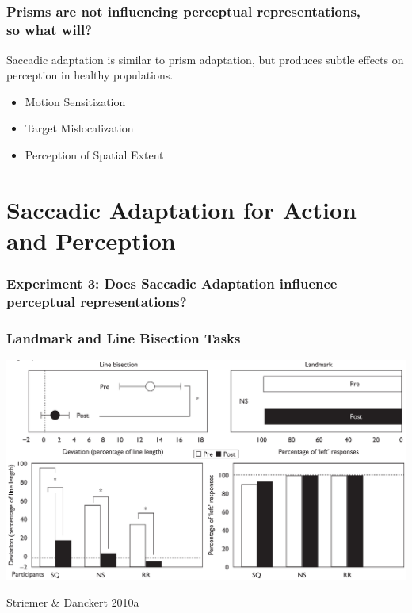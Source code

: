 \documentclass{beamer}
\begin{document}
\subsection*{}
\begin{frame}
	\frametitle{Prisms are not influencing perceptual representations, \\ so what will?}
	Saccadic adaptation is similar to prism adaptation, but produces subtle effects on perception in healthy populations.
	\begin{itemize}
		\item Motion Sensitization
		\item Target Mislocalization
		\item Perception of Spatial Extent
	\end{itemize}
\end{frame}


\section[Saccadic Adaptation]{Saccadic Adaptation for Action and Perception}

\begin{frame}
	\frametitle{Experiment 3: Does Saccadic Adaptation influence perceptual representations?}
		\tableofcontents[currentsection]
\end{frame}

\end{document}
